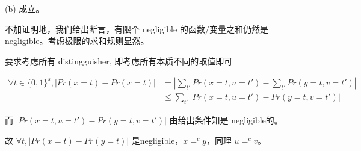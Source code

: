 \documentclass[12pt, a4paper, oneside]{ctexart}
\begin{document}
	(b) 成立。
	
	不加证明地，我们给出断言，有限个 negligible 的函数/变量之和仍然是 negligible。考虑极限的求和规则显然。
	
	要求考虑所有 distingguisher, 即考虑所有本质不同的取值即可
	
	$$
	\begin{aligned}
	\forall t \in \{0,1\}^s,|Pr(x=t)-Pr(x=t)| &= |\sum_{t'}Pr(x=t,u=t')-\sum_{t'}Pr(y=t,v=t')|\\&\leq \sum_{t'}|Pr(x=t,u=t')-Pr(y=t,v=t')|
	\end{aligned}
	$$
	
	而 $|Pr(x=t,u=t')-Pr(y=t,v=t')|$ 由给出条件知是 negligible的。	
	
	故 $\forall t, |Pr(x=t)-Pr(y=t)|$ 是negligible，$x=^c y$，同理 $u=^c v$。
	
\end{document}
